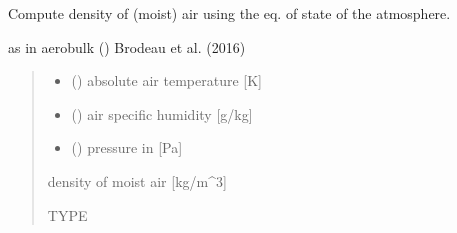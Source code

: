 \documentclass[letterpaper,10pt,english]{sphinxmanual}
\begin{document}
\begin{fulllineitems}
\label{\detokenize{users_guide:util_subs.rho_air}}
\pysigstartsignatures
{}
\pysigstopsignatures
\sphinxAtStartPar
Compute density of (moist) air using the eq. of state of the atmosphere.

\sphinxAtStartPar
as in aerobulk () Brodeau et al. (2016)
\begin{quote}\begin{description}
\begin{itemize}
\item {} 
\sphinxAtStartPar
{} () \textendash{} absolute air temperature             {[}K{]}

\item {} 
\sphinxAtStartPar
{} () \textendash{} air specific humidity   {[}g/kg{]}

\item {} 
\sphinxAtStartPar
{} () \textendash{} pressure in                {[}Pa{]}

\end{itemize}

\sphinxAtStartPar
{} \textendash{} density of moist air   {[}kg/m\textasciicircum{}3{]}

\sphinxAtStartPar
TYPE

\end{description}\end{quote}

\end{fulllineitems}

\end{document}
